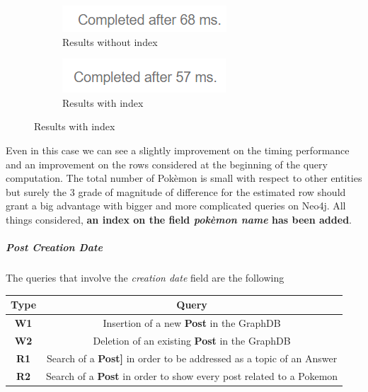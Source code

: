 \begin{figure}[H]
\begin{subfigure}{0.5\textwidth}
	\end{subfigure}
\end{figure}
\begin{figure}[H]
	\begin{subfigure}{0.5\textwidth}
		\includegraphics[width=0.9\linewidth]{img/pokemon_without_index_2.png} 
		\caption{Results without index}
	\end{subfigure}
	\begin{subfigure}{0.5\textwidth}
		\includegraphics[width=0.9\linewidth]{img/pokemon_with_index_2.png}
		\caption{Results with index}
	\end{subfigure}
\end{figure}

Even in this case we can see a slightly improvement on the timing performance and an improvement on the rows considered at the beginning of the query computation. The total number of Pokèmon is small with respect to other entities but surely the 3 grade of magnitude of difference for the estimated row should grant a big advantage with bigger and more complicated queries on Neo4j. All things considered, \textbf{an index on the field \textit{pokèmon name} has been added}.
\subparagraph{Post Creation Date}
The queries that involve the \textit{creation date} field are the following

\begin{center}
	\begin{tabular}{| c | c |} 
		\hline
		\textbf{Type} & \textbf{Query} \\ [0.5ex] 
		\hline
		\textbf{W1} & Insertion of a new \textbf{Post} in the GraphDB\\ 
		\hline
		\textbf{W2} & Deletion of an existing \textbf{Post} in the GraphDB \\
		\hline
		\textbf{R1} & Search of a \textbf{Post]} in order to be addressed as a topic of an Answer\\
		\hline
		\textbf{R2} & Search of a \textbf{Post} in order to show every post related to a Pokemon\\
		\hline
	\end{tabular}
\end{center}


